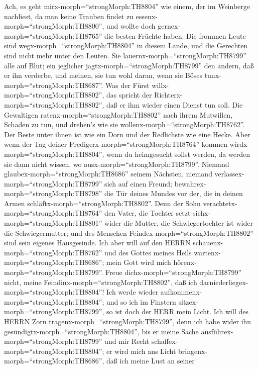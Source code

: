  Ach, es geht mirx-morph=``strongMorph:TH8804'' wie einem,
der im Weinberge nachliest, da man keine Trauben findet zu
essenx-morph=``strongMorph:TH8800'', und wollte doch
gernex-morph=``strongMorph:TH8765'' die besten Früchte haben.
 Die frommen Leute sind wegx-morph=``strongMorph:TH8804'' in
diesem Lande, und die Gerechten sind nicht mehr unter den Leuten. Sie
lauernx-morph=``strongMorph:TH8799'' alle auf Blut; ein jeglicher
jagtx-morph=``strongMorph:TH8799'' den andern, daß er ihn verderbe,
 und meinen, sie tun wohl daran, wenn sie Böses
tunx-morph=``strongMorph:TH8687''. Was der Fürst
willx-morph=``strongMorph:TH8802'', das spricht der
Richterx-morph=``strongMorph:TH8802'', daß er ihm wieder einen Dienst
tun soll. Die Gewaltigen ratenx-morph=``strongMorph:TH8802'' nach ihrem
Mutwillen, Schaden zu tun, und drehen's wie sie
wollenx-morph=``strongMorph:TH8762''.  Der Beste unter ihnen
ist wie ein Dorn und der Redlichste wie eine Hecke. Aber wenn der Tag
deiner Predigerx-morph=``strongMorph:TH8764'' kommen
wirdx-morph=``strongMorph:TH8804'', wenn du heimgesucht sollst werden,
da werden sie dann nicht wissen, wo ausx-morph=``strongMorph:TH8799''.
 Niemand glaubex-morph=``strongMorph:TH8686'' seinem
Nächsten, niemand verlassex-morph=``strongMorph:TH8799'' sich auf einen
Freund; bewahrex-morph=``strongMorph:TH8798'' die Tür deines Mundes vor
der, die in deinen Armen schläftx-morph=``strongMorph:TH8802''.
 Denn der Sohn verachtetx-morph=``strongMorph:TH8764'' den
Vater, die Tochter setzt sichx-morph=``strongMorph:TH8801'' wider die
Mutter, die Schwiegertochter ist wider die Schwiegermutter; und des
Menschen Feindex-morph=``strongMorph:TH8802'' sind sein eigenes
Hausgesinde.  Ich aber will auf den HERRN
schauenx-morph=``strongMorph:TH8762'' und des Gottes meines Heils
wartenx-morph=``strongMorph:TH8686''; mein Gott wird mich
hörenx-morph=``strongMorph:TH8799''.  Freue
dichx-morph=``strongMorph:TH8799'' nicht, meine
Feindinx-morph=``strongMorph:TH8802'', daß ich
darniederliegex-morph=``strongMorph:TH8804''! Ich werde wieder
aufkommenx-morph=``strongMorph:TH8804''; und so ich im Finstern
sitzex-morph=``strongMorph:TH8799'', so ist doch der HERR mein Licht.
 Ich will des HERRN Zorn
tragenx-morph=``strongMorph:TH8799'', denn ich habe wider ihn
gesündigtx-morph=``strongMorph:TH8804'', bis er meine Sache
ausführex-morph=``strongMorph:TH8799'' und mir Recht
schaffex-morph=``strongMorph:TH8804''; er wird mich ans Licht
bringenx-morph=``strongMorph:TH8686'', daß ich meine Lust an seiner
